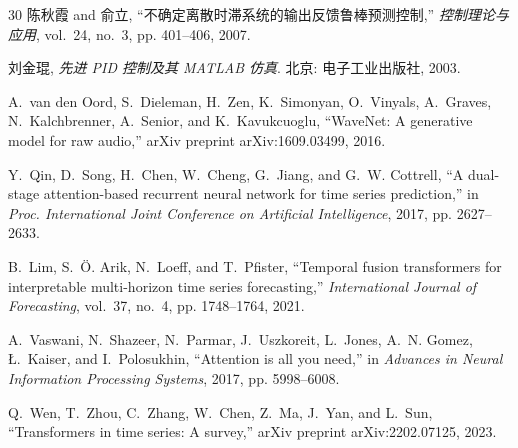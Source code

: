 \documentclass[journal]{IEEEtran}
\begin{document}
\begin{thebibliography}{30}
陈秋霞 and 俞立, ``不确定离散时滞系统的输出反馈鲁棒预测控制,'' \emph{控制理论与应用}, vol.~24, no.~3, pp. 401--406, 2007.

刘金琨, \emph{先进 PID 控制及其 MATLAB 仿真}. 北京: 电子工业出版社, 2003.

A.~van den Oord, S.~Dieleman, H.~Zen, K.~Simonyan, O.~Vinyals, A.~Graves, N.~Kalchbrenner, A.~Senior, and K.~Kavukcuoglu, ``WaveNet: A generative model for raw audio,'' arXiv preprint arXiv:1609.03499, 2016.

Y.~Qin, D.~Song, H.~Chen, W.~Cheng, G.~Jiang, and G.~W. Cottrell, ``A dual-stage attention-based recurrent neural network for time series prediction,'' in \emph{Proc. International Joint Conference on Artificial Intelligence}, 2017, pp. 2627--2633.

B.~Lim, S.~Ö. Arik, N.~Loeff, and T.~Pfister, ``Temporal fusion transformers for interpretable multi-horizon time series forecasting,'' \emph{International Journal of Forecasting}, vol.~37, no.~4, pp. 1748--1764, 2021.

A.~Vaswani, N.~Shazeer, N.~Parmar, J.~Uszkoreit, L.~Jones, A.~N. Gomez, Ł.~Kaiser, and I.~Polosukhin, ``Attention is all you need,'' in \emph{Advances in Neural Information Processing Systems}, 2017, pp. 5998--6008.

Q.~Wen, T.~Zhou, C.~Zhang, W.~Chen, Z.~Ma, J.~Yan, and L.~Sun, ``Transformers in time series: A survey,'' arXiv preprint arXiv:2202.07125, 2023.

\end{thebibliography}
\end{document}
